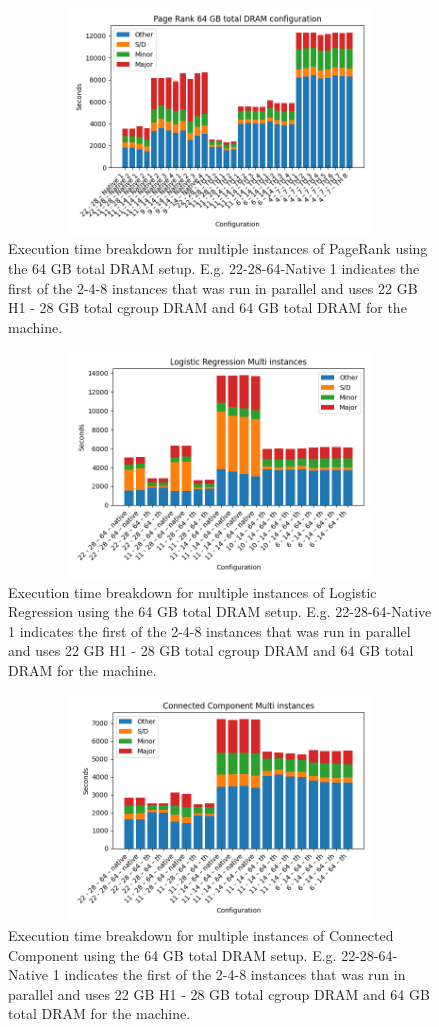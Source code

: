 \documentclass[twocolumn,10pt]{asme2e}
\begin{document}
\begin{figure}[h!]
        \includegraphics[width=13cm,height=6cm]{pr64.png}
	\caption{Execution time breakdown for multiple instances of PageRank using the 64 GB total DRAM setup. 
	E.g. 22-28-64-Native 1 indicates the first of the 2-4-8 instances that was run in parallel and uses 22 GB H1 - 28 GB total cgroup DRAM and 64 GB total DRAM for the machine.}
	\label{fig:pr64}
\end{figure}

\begin{figure}[h!]
        \includegraphics[width=13cm,height=6cm]{logr64.png}
	\caption{Execution time breakdown for multiple instances of Logistic Regression using the 64 GB total DRAM setup. 
	E.g. 22-28-64-Native 1 indicates the first of the 2-4-8 instances that was run in parallel and uses 22 GB H1 - 28 GB total cgroup DRAM and 64 GB total DRAM for the machine.}
	\label{fig:logr64}
\end{figure}

\begin{figure}[h!]
        \includegraphics[width=13cm,height=6cm]{cc64.png}
	\caption{Execution time breakdown for multiple instances of Connected Component using the 64 GB total DRAM setup. 
	E.g. 22-28-64-Native 1 indicates the first of the 2-4-8 instances that was run in parallel and uses 22 GB H1 - 28 GB total cgroup DRAM and 64 GB total DRAM for the machine.}
	\label{fig:cc64}
\end{figure}
\end{document}
